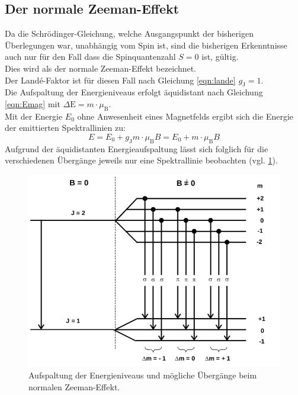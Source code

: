 \subsection{Der normale Zeeman-Effekt}
Da die Schrödinger-Gleichung, welche Ausgangspunkt der bisherigen Überlegungen war, unabhängig vom Spin ist, sind die bisherigen Erkenntnisse auch nur für den Fall dass die Spinquantenzahl $S=0$ ist, gültig.\\
Dies wird als der normale Zeeman-Effekt bezeichnet.\\ Der Landé-Faktor ist für diesen Fall nach Gleichung \eqref{eqn:lande} $g_{\mathrm{J}}=1$.\\
Die Aufspaltung der Energieniveaus erfolgt äquidistant nach Gleichung \eqref{eqn:Emag} mit $\Delta \mathrm{E}=m\cdot \mu_{\mathrm{B}}$.\\
Mit der Energie $E_0$ ohne Anwesenheit eines Magnetfelds ergibt sich die Energie der emittierten Spektrallinien zu:
\begin{equation}
  \label{eqn:normaler}
  E=E_0+ g_{\mathrm{J}}m\cdot \mu_{\mathrm{B}} B=E_0+ m\cdot \mu_{\mathrm{B}} B
\end{equation}
Aufgrund der äquidistanten Energieaufspaltung lässt sich folglich für die verschiedenen Übergänge jeweils nur eine Spektrallinie beobachten (vgl. \ref{fig:normaler}).
\begin{figure}
  \centering
  \includegraphics[width=0.75\columnwidth]{pictures/linienaufspaltung.png}
  \caption{Aufspaltung der Energieniveaus und mögliche Übergänge beim normalen Zeeman-Effekt.\cite{Anleitung}}
  \label{fig:normaler}
\end{figure}
